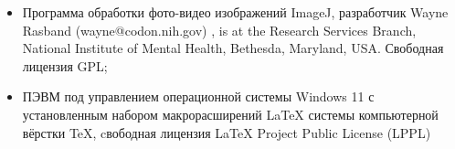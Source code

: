 \begin{itemize}
%	
\item 
 Программа обработки фото-видео изображений ImageJ, разработчик  Wayne Rasband (wayne@codon.nih.gov) , is at the Research Services Branch, National Institute of Mental Health, Bethesda, Maryland, USA. Свободная лицензия GPL;
\item  
ПЭВМ под управлением операционной системы Windows 11 с установленным набором макрорасширений LaTeX системы компьютерной вёрстки TeX, cвободная лицензия LaTeX Project Public License (LPPL)
\end{itemize}